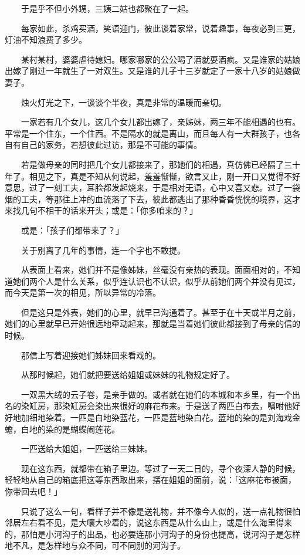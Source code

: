 \documentclass[UTF8]{ctexart}
\begin{document}
　　于是乎不但小外甥，三姨二姑也都聚在了一起。

　　每家如此，杀鸡买酒，笑语迎门，彼此谈着家常，说着趣事，每夜必到三更，灯油不知浪费了多少。

　　某村某村，婆婆虐待媳妇。哪家哪家的公公喝了酒就耍酒疯。又是谁家的姑娘出嫁了刚过一年就生了一对双生。又是谁的儿子十三岁就定了一家十八岁的姑娘做妻子。

　　烛火灯光之下，一谈谈个半夜，真是非常的温暖而亲切。

　　一家若有几个女儿，这几个女儿都出嫁了，亲姊妹，两三年不能相遇的也有。平常是一个住东，一个住西。不是隔水的就是离山，而且每人有一大群孩子，也各自有自己的家务，若想彼此过访，那是不可能的事情。

　　若是做母亲的同时把几个女儿都接来了，那她们的相遇，真仿佛已经隔了三十年了。相见之下，真是不知从何说起，羞羞惭惭，欲言又止，刚一开口又觉得不好意思，过了一刻工夫，耳脸都发起烧来，于是相对无语，心中又喜又悲。过了一袋烟的工夫，等那往上冲的血流落了下去，彼此都逃出了那种昏昏恍恍的境界，这才来找几句不相干的话来开头；或是：「你多咱来的？」

　　或是：「孩子们都带来了？」

　　关于别离了几年的事情，连一个字也不敢提。

　　从表面上看来，她们并不是像姊妹，丝毫没有亲热的表现。面面相对的，不知道她们两个人是什么关系，似乎连认识也不认识，似乎从前她们两个并没有见过，而今天是第一次的相见，所以异常的冷落。

　　但是这只是外表，她们的心里，就早已沟通着了。甚至于在十天或半月之前，她们的心里就早已开始很远地牵动起来，那就是当着她们彼此都接到了母亲的信的时候。

　　那信上写着迎接她们姊妹回来看戏的。

　　从那时候起，她们就把要送给姐姐或妹妹的礼物规定好了。

　　一双黑大绒的云子卷，是亲手做的。或者就在她们的本城和本乡里，有一个出名的染缸房，那染缸房会染出来很好的麻花布来。于是送了两匹白布去，嘱咐他好好地加细地染着。一匹是白地染蓝花，一匹是蓝地染白花。蓝地的染的是刘海戏金蟾，白地的染的是蝴蝶闹莲花。

　　一匹送给大姐姐，一匹送给三妹妹。

　　现在这东西，就都带在箱子里边。等过了一天二日的，寻个夜深人静的时候，轻轻地从自己的箱底把这等东西取出来，摆在姐姐的面前，说：「这麻花布被面，你带回去吧！」

　　只说了这么一句，看样子并不像是送礼物，并不像今人似的，送一点礼物很怕邻居左右看不见，是大嚷大吵着的，说这东西是从什么山上，或是什么海里得来的，那怕是小河沟子的出品，也必要连那小河沟子的身份也提高，说河沟子是怎样地不凡，是怎样地与众不同，可不同别的河沟子。
\end{document}
